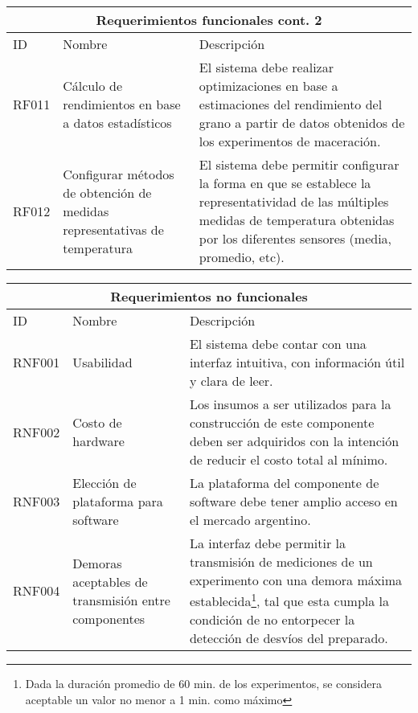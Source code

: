     \begin{table}[H]
    \begin{center}
    \begin{tabularx}{\textwidth}{| X | X | X |}
    \hline
    \multicolumn{3}{|c|}{\textbf{Requerimientos funcionales cont. 2}} \\
    \hline
    ID & Nombre & Descripción \\
    \hline
    \hline

         RF011 & Cálculo de rendimientos en base a datos estadísticos & El sistema debe realizar optimizaciones en base a estimaciones del rendimiento del grano a partir de datos obtenidos de los experimentos de maceración.
         \\\hline
         RF012 & Configurar métodos de obtención de medidas representativas de temperatura & El sistema debe permitir configurar la forma en que se establece la representatividad de las múltiples medidas de temperatura obtenidas por los diferentes sensores (media, promedio, etc).
     \\\hline
    \end{tabularx}
    \label{ReqFuncionales_Parte3}
    \end{center}
    \end{table}
    
    \begin{table}[H]
    \begin{center}
    \begin{tabularx}{\textwidth}{| X | X | X |}
    \hline
    \multicolumn{3}{|c|}{\textbf{Requerimientos no funcionales}} \\
    \hline
    ID & Nombre & Descripción \\
    \hline
    \hline
         RNF001 & Usabilidad & El sistema debe contar con una interfaz intuitiva, con información útil y clara de leer. \\\hline
         RNF002 & Costo de hardware & Los insumos a ser utilizados para la construcción de este componente deben ser adquiridos con la intención de reducir el costo total al mínimo.
         \\\hline
         RNF003 & Elección de plataforma para software & La plataforma del componente de software debe tener amplio acceso en el mercado argentino. 
         \\\hline
         RNF004 & Demoras aceptables de transmisión entre componentes & La interfaz debe permitir la transmisión de mediciones de un experimento con una demora máxima establecida\footnote{Dada la duración promedio de 60 min. de los experimentos, se considera aceptable un valor no menor a 1 min. como máximo}, tal que esta cumpla la condición de no entorpecer la detección de desvíos del preparado.
         \\ \hline
     \end{tabularx}
    \label{ReqNoFuncionales_Parte2}
    \end{center}
    \end{table}
    
